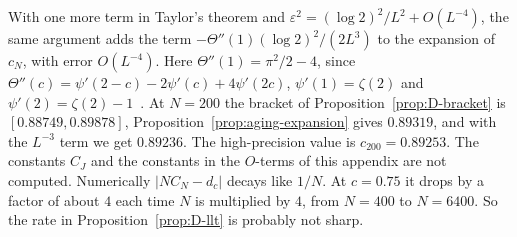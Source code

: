 With one more term in Taylor's theorem and
$\varepsilon^2=(\log2)^2/L^2+O(L^{-4})$, the same argument adds the term
$-\Theta''(1)(\log2)^2/(2L^3)$ to the expansion of $c_N$, with error
$O(L^{-4})$. Here $\Theta''(1)=\pi^2/2-4$, since
$\Theta''(c)=\psi'(2-c)-2\psi'(c)+4\psi'(2c)$, $\psi'(1)=\zeta(2)$ and
$\psi'(2)=\zeta(2)-1$~\cite[5.4.12, 5.15.5]{dlmf}. At $N=200$ the bracket of
Proposition~\ref{prop:D-bracket} is $[0.88749,0.89878]$,
Proposition~\ref{prop:aging-expansion} gives $0.89319$, and with the $L^{-3}$
term we get $0.89236$. The high-precision value is $c_{200}=0.89253$. The
constants $C_J$ and the constants in the $O$-terms of this appendix are not
computed. Numerically $\lvert NC_N-d_c\rvert$ decays like $1/N$. At $c=0.75$
it drops by a factor of about $4$ each time $N$ is multiplied by $4$, from
$N=400$ to $N=6400$. So the rate in Proposition~\ref{prop:D-llt} is probably
not sharp.
